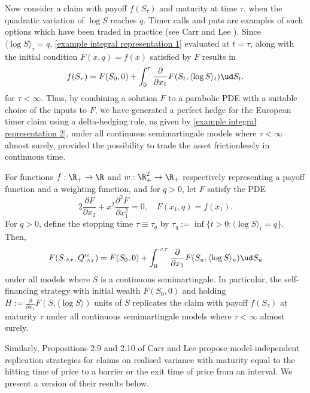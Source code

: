 \documentclass[11pt]{article}
\begin{document}
Now consider a claim with payoff $f(S_\tau)$ and maturity at time $\tau$, when the quadratic variation of $\log S$ reaches $q$. Timer calls and puts are examples of such options which have been traded in practice (see Carr and Lee \cite{Carr-Lee:volatility}). Since $\langle \log S \rangle_\tau=q$, \eqref{example integral representation 1} evaluated at $t = \tau$, along with the initial condition $F(x,q)=f(x)$ satisfied by $F$ results in
\begin{equation}
\label{example integral representation 2}
f(S_{\tau}) = F(S_{0},0) + \int_{0}^{\tau} \frac{\partial}{\partial x_1} F(S_{t},\langle \log S \rangle_{t})\ud S_{t}.
\end{equation}
for $\tau < \infty$. Thus, by combining a solution $F$ to a parabolic PDE with a suitable choice of the inputs to $F$, we have generated a perfect hedge for the European timer claim using a delta-hedging rule, as given by \eqref{example integral representation 2}, under all continuous semimartingale models where $\tau < \infty$ almost surely, provided the possibility to trade the asset frictionlessly in continuous time.

\begin{proposition}
\label{proposition: Bick}
For functions $f: \R_+  \to \R$ and $w: \R_+^2 \to \R_+$ respectively representing a payoff function and a weighting function, and for $q > 0$, let $F$ satisfy the PDE 
\begin{equation}
\label{Bick PDE}
2 \frac{\partial F}{\partial x_2} + x^2 \frac{\partial^2 F}{\partial x_1^2} = 0, \quad F(x_1,q)=f(x_1).
\end{equation}
For $q > 0$, define the stopping time $\tau \equiv \tau_q$ by $\tau_q := \inf \{t > 0: \langle \log S \rangle_t = q\}$. Then,
\begin{equation}
\label{Bick integral representation}
F(S_{\cdot \wedge \tau},Q^w_{\cdot \wedge \tau}) = F(S_{0},0) + \int_{0}^{\cdot \wedge \tau} \frac{\partial}{\partial x_1} F(S_{u},\langle \log S \rangle_u) \ud S_{u}
\end{equation}
under all models where $S$ is a continuous semimartingale. In particular, the self-financing strategy with initial wealth $F(S_{0},0)$ and holding $H := \frac{\partial}{\partial x_1} F(S,\langle \log S \rangle)$ units of $S$ replicates the claim with payoff $f(S_{\tau})$ at maturity $\tau$ under all continuous semimartingale models where $\tau < \infty$ almost surely.
\end{proposition}

Similarly, Propositions 2.9 and 2.10 of Carr and Lee \cite{Carr-Lee:semimartingales} propose model-independent replication strategies for claims on realised variance with maturity equal to the hitting time of price to a barrier or the exit time of price from an interval. We present a version of their results below.
\end{document}
